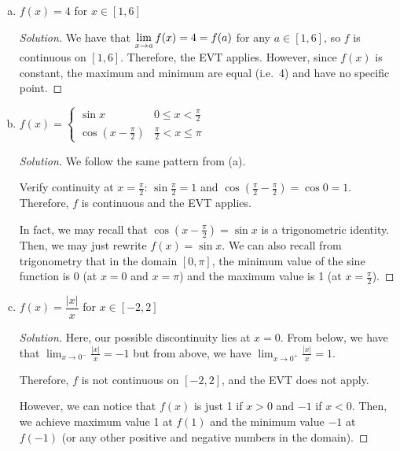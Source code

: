 \begin{enumerate}[(a)]
\begin{proof}[Solution]
          Recall that $e^x$ decreases for decreasing $x$ and $e^{-x}$ decreases for increasing $x$.
          Therefore, $f$ has no minimum value, since it approaches 0 as $x\to\pm\infty$.
          However, for the same reasons, $f$ has its maximum value at $f(0)=1$.
        \end{proof}
  \item $f(x)=4$ for $x \in [1,6]$
        \begin{proof}[Solution]
          We have that $\displaystyle\lim_{x\to a}f(x)=4=f(a)$ for any $a\in[1,6]$, so $f$ is continuous on $[1,6]$.
          Therefore, the EVT applies.
          However, since $f(x)$ is constant, the maximum and minimum are equal (i.e.\ 4) and have no specific point.
        \end{proof}
  \item $f(x)=\begin{cases}
            \sin x                & 0 \leq x < \frac{\pi}{2}   \\
            \cos(x-\frac{\pi}{2}) & \frac{\pi}{2} < x \leq \pi
          \end{cases}$
        \begin{proof}[Solution]
          We follow the same pattern from (a).

          Verify continuity at $x=\frac\pi2$:
          $\sin \frac\pi2 = 1$ and $\cos(\frac\pi2-\frac\pi2)=\cos 0=1$.
          Therefore, $f$ is continuous and the EVT applies.

          In fact, we may recall that $\cos(x-\frac\pi2)=\sin x$ is a trigonometric identity.
          Then, we may just rewrite $f(x)=\sin x$.
          We can also recall from trigonometry that in the domain $[0,\pi]$,
          the minimum value of the sine function is 0 (at $x=0$ and $x=\pi$)
          and the maximum value is 1 (at $x=\frac\pi2$).
        \end{proof}
  \item $f(x) = \dfrac{|x|}{x}$ for $x \in [-2,2]$
        \begin{proof}[Solution]
          Here, our possible discontinuity lies at $x=0$.
          From below, we have that $\lim_{x\to0^-}\frac{|x|}{x} = -1$
          but from above, we have $\lim_{x\to0^+}\frac{|x|}{x} = 1$.

          Therefore, $f$ is not continuous on $[-2,2]$, and the EVT does not apply.

          However, we can notice that $f(x)$ is just 1 if $x>0$ and $-1$ if $x<0$.
          Then, we achieve maximum value 1 at $f(1)$ and the minimum value $-1$ at $f(-1)$
          (or any other positive and negative numbers in the domain).
        \end{proof}
\end{enumerate}


